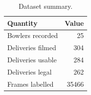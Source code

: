 \begin{table}[htbp]
  \centering
  \caption{Dataset summary.}
  \label{tab:dataset}
  \begin{tabular}{lr}
    \toprule
    Quantity & Value \\
    \midrule
    Bowlers recorded & 25 \\
    Deliveries filmed & 304 \\
    Deliveries usable & 284 \\
    Deliveries legal & 262 \\
    Frames labelled & 35466 \\
    \bottomrule
  \end{tabular}
\end{table}
